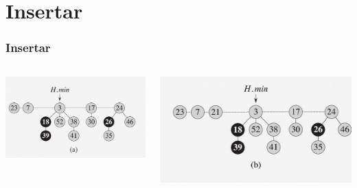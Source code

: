 \documentclass{beamer}
\begin{document}
\section{Insertar}
\begin{frame}
  \frametitle{Insertar}
  \begin{columns}[t]
    \includegraphics[width =1 \textwidth]{imagenes/insertar1.png}
      
    \includegraphics[width =1 \textwidth]{imagenes/insertar2.png}

   \end{columns}
  
\end{frame}
\end{document}
